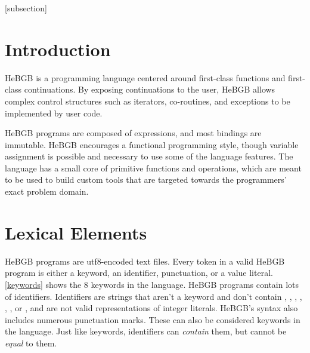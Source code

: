 \documentclass[12pt]{article}
\begin{document}
[subsection]\setcounter{codebox}{0}
\renewcommand{\thecodebox}{\arabic{section}.\arabic{subsection}.\arabic{codebox}}

\newenvironment{code_box}{
\refstepcounter{codebox}
\mdfsetup{%
frametitle={%
    \tikz[baseline=(current bounding box.east),outer sep=0pt]
    \node[anchor=east,rectangle,fill=white]
    {\strut \thecodebox};}
}%
\mdfsetup{%
    innertopmargin=10pt,linecolor=black,%
    linewidth=1pt,topline=true,%
    frametitleaboveskip=\dimexpr-\ht\strutbox\relax%
}
\begin{mdframed}[]\relax}{%
\end{mdframed}}

\section{Introduction}
HeBGB is a programming language centered around first-class functions
and first-class continuations. By exposing continuations to the user,
HeBGB allows complex control structures such as iterators, co-routines,
and exceptions to be implemented by user code.

HeBGB programs are composed of expressions, and most bindings are immutable.
HeBGB encourages a functional programming style, though variable assignment
is possible and necessary to use some of the language features.
The language has a small core of primitive functions and operations, which
are meant to be used to build custom tools that are targeted towards
the programmers' exact problem domain.
\section{Lexical Elements}
HeBGB programs are utf8-encoded text files. Every token in a valid
HeBGB program is either a keyword, an identifier, punctuation, or a value
literal. \ref{keywords} shows the 8 keywords in the language. 
HeBGB programs contain lots of identifiers. Identifiers 
are strings that aren't a keyword and don't contain 
, \Term{(}, \Term{)}, \Term{\{}, \Term{\}}, \Term{[}, or \Term{]}, 
and are not valid representations of integer literals. 
HeBGB's syntax also includes numerous punctuation marks. These
can also be considered keywords in the language. Just like keywords,
identifiers can \textit{contain} them, but cannot be \textit{equal} to them.
\end{document}
